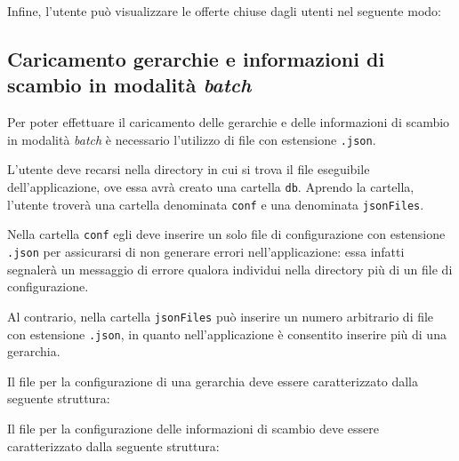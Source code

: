 Infine, l'utente può visualizzare le offerte chiuse dagli utenti nel seguente modo:


\subsection{Caricamento gerarchie e informazioni di scambio in modalità \textit{batch}}
Per poter effettuare il caricamento delle gerarchie e delle informazioni di scambio in modalità \textit{batch} è necessario l'utilizzo di file con estensione \texttt{.json}. 

L'utente deve recarsi nella directory in cui si trova il file eseguibile dell'applicazione, ove essa avrà creato una cartella \texttt{db}. 
Aprendo la cartella, l'utente troverà una cartella denominata \texttt{conf} e una denominata \texttt{jsonFiles}.

Nella cartella \texttt{conf} egli deve inserire un solo file di configurazione con estensione \texttt{.json} per assicurarsi di non generare errori nell'applicazione: essa infatti segnalerà un messaggio di errore qualora individui nella directory più di un file di configurazione. 

Al contrario, nella cartella \texttt{jsonFiles} può inserire un numero arbitrario di file con estensione \texttt{.json}, in quanto nell'applicazione è consentito inserire più di una gerarchia. 

Il file per la configurazione di una gerarchia deve essere caratterizzato dalla seguente struttura:


Il file per la configurazione delle informazioni di scambio deve essere caratterizzato dalla seguente struttura:
